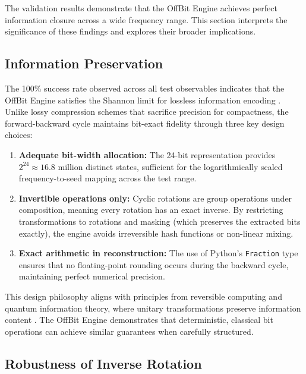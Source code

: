 \documentclass[11pt,letterpaper]{article}
\begin{document}
The validation results demonstrate that the OffBit Engine achieves perfect information closure across a wide frequency range. This section interprets the significance of these findings and explores their broader implications.

\subsection{Information Preservation}
\label{subsec:preservation}

The 100\% success rate observed across all test observables indicates that the OffBit Engine satisfies the Shannon limit for lossless information encoding \cite{shannon1948,entropy2024}. Unlike lossy compression schemes that sacrifice precision for compactness, the forward-backward cycle maintains bit-exact fidelity through three key design choices:

\begin{enumerate}
    \item \textbf{Adequate bit-width allocation:} The 24-bit representation provides $2^{24} \approx 16.8$ million distinct states, sufficient for the logarithmically scaled frequency-to-seed mapping across the test range.

    \item \textbf{Invertible operations only:} Cyclic rotations are group operations under composition, meaning every rotation has an exact inverse. By restricting transformations to rotations and masking (which preserves the extracted bits exactly), the engine avoids irreversible hash functions or non-linear mixing.

    \item \textbf{Exact arithmetic in reconstruction:} The use of Python's \texttt{Fraction} type ensures that no floating-point rounding occurs during the backward cycle, maintaining perfect numerical precision.
\end{enumerate}

This design philosophy aligns with principles from reversible computing and quantum information theory, where unitary transformations preserve information content \cite{windarta2022}. The OffBit Engine demonstrates that deterministic, classical bit operations can achieve similar guarantees when carefully structured.

\subsection{Robustness of Inverse Rotation}
\label{subsec:robustness}
\end{document}
